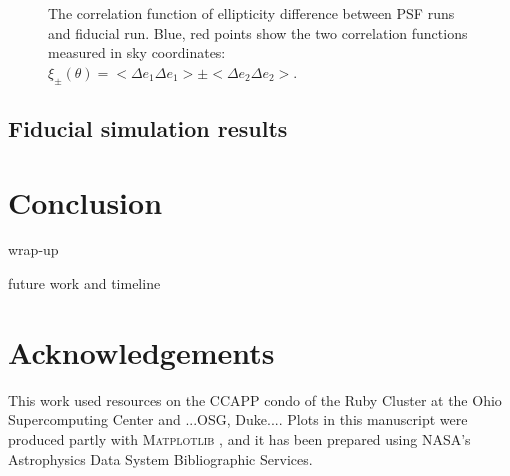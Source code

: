 \documentclass[aps,prd, amsmath,amssymb,superscriptaddress,showkeys,nofootinbib,reprint,preprintnumbers]{revtex4-1}
\begin{document}
\begin{figure}
\begin{center}
\end{center}
\caption[]{ The correlation function of ellipticity difference between PSF runs and fiducial run. Blue, red points show the two correlation functions measured in sky coordinates: $\xi_{\pm}(\theta)=<\Delta e_1\Delta e_1>\pm<\Delta e_2\Delta e_2>.$
\label{fig:f2pt_corrs}}
\end{figure}

\subsection{Fiducial simulation results}\label{sec:results}

\section{Conclusion}\label{sec:conclusion}

wrap-up

future work and timeline

\section*{Acknowledgements}

This work used resources on the CCAPP condo of the Ruby Cluster at the Ohio Supercomputing Center \cite{OhioSupercomputerCenter1987} and ...OSG, Duke.... Plots in this manuscript were produced partly with \textsc{Matplotlib} \cite{Hunter:2007}, and it has been prepared using NASA's Astrophysics Data System Bibliographic Services.

\appendix
\end{document}
